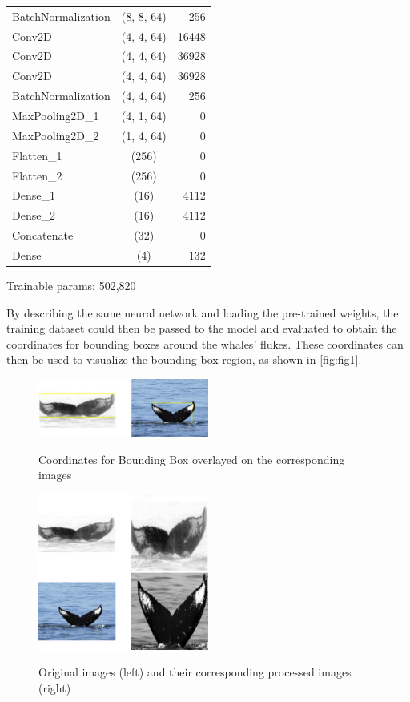 \documentclass[paper=a4, fontsize=11pt]{scrartcl}
\numberwithin{equation}{section}		%
\numberwithin{table}{section}				%
\begin{document}
\begin{table}[h!]
\begin{center}
\begin{tabular}{l|c|r}
      BatchNormalization & (8, 8, 64) & 256\\
      Conv2D & (4, 4, 64) & 16448\\
      Conv2D & (4, 4, 64) & 36928\\
      Conv2D & (4, 4, 64) & 36928\\
      BatchNormalization & (4, 4, 64) & 256\\
      MaxPooling2D\_1 & (4, 1, 64) & 0\\
      MaxPooling2D\_2 & (1, 4, 64) & 0\\
      Flatten\_1 & (256) & 0\\
      Flatten\_2 & (256) & 0\\
      Dense\_1 & (16) & 4112\\
      Dense\_2 & (16) & 4112\\
      Concatenate & (32) & 0\\
      Dense & (4) & 132\\
    \end{tabular}
      \small
      \item Trainable params: 502,820
  \end{center}
\end{table}

By describing the same neural network and loading the pre-trained weights, the training dataset could then be passed to the model and evaluated to obtain the coordinates for bounding boxes around the whales' flukes. These coordinates can then be used to visualize the bounding box region, as shown in \autoref{fig:fig1}.

\begin{figure}[h]
    \caption{Coordinates for Bounding Box overlayed on the corresponding images}
    \centering
    \includegraphics[width=0.5\textwidth]{BoundingBoxExample.png}
    \label{fig:fig1}
\end{figure}

\begin{figure}[h]
    \caption{Original images (left) and their corresponding processed images (right)}
    \centering
    \includegraphics[width=0.5\textwidth]{ProcessedImages.png}
    \label{fig:fig2}
\end{figure}
\end{document}
